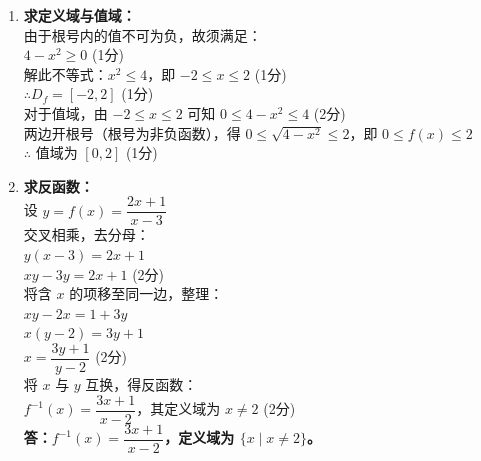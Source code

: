 \documentclass[12pt,a4paper]{exam-zh}
\begin{document}
\begin{solution}
    \begin{enumerate}[label=(\alph*)]
        \item \textbf{求定义域与值域：} \\
        由于根号内的值不可为负，故须满足： \\
        $4 - x^2 \geq 0$ \hfill (1分) \\
        解此不等式：$x^2 \leq 4$，即 $-2 \leq x \leq 2$ \hfill (1分) \\
        $\therefore D_f = [-2, 2]$ \hfill (1分) \\
        对于值域，由 $-2 \leq x \leq 2$ 可知 $0 \leq 4 - x^2 \leq 4$ \hfill (2分) \\
        两边开根号（根号为非负函数），得 $0 \leq \sqrt{4 - x^2} \leq 2$，即 $0 \leq f(x) \leq 2$ \\
        $\therefore$ 值域为 $[0, 2]$ \hfill (1分)

        \item \textbf{求反函数：} \\
        设 $y = f(x) = \dfrac{2x + 1}{x - 3}$ \\
        交叉相乘，去分母： \\
        $y(x - 3) = 2x + 1$ \\
        $xy - 3y = 2x + 1$ \hfill (2分) \\
        将含 $x$ 的项移至同一边，整理： \\
        $xy - 2x = 1 + 3y$ \\
        $x(y - 2) = 3y + 1$ \\
        $x = \dfrac{3y + 1}{y - 2}$ \hfill (2分) \\
        将 $x$ 与 $y$ 互换，得反函数： \\
        $f^{-1}(x) = \dfrac{3x + 1}{x - 2}$，其定义域为 $x \neq 2$ \hfill (2分) \\
        \textbf{答：$f^{-1}(x) = \dfrac{3x + 1}{x - 2}$，定义域为 $\{x \mid x \neq 2\}$。}
    \end{enumerate}
\end{solution}

\end{document}
